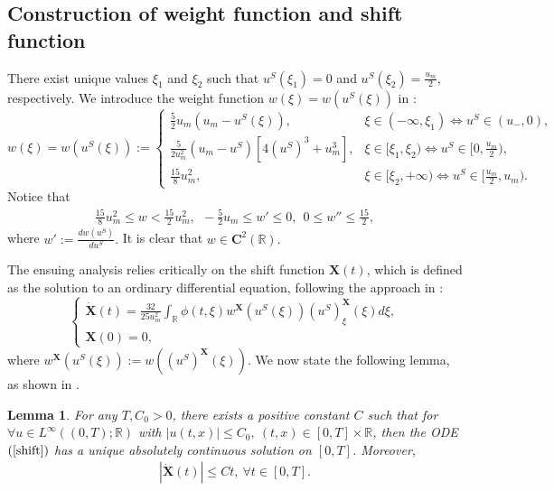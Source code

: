 \documentclass[10pt,reqno]{amsart}
\numberwithin{equation}{section}
\newtheorem{lemma}[theorem]{Lemma}
\begin{document}
	\subsection{Construction of weight function and shift function}
	There exist unique values $\xi_{1}$ and $\xi_{2}$ such that $u^S(\xi_1)=0$ and $u^S(\xi_2)= \frac{u_m}{2}$, respectively. We introduce the weight function $w(\xi)=w(u^{S}(\xi))$ in \cite{ref16}:
	\begin{equation} \label{WF}
		w(\xi)=w(u^{S}(\xi)) := \begin{cases}
			\frac{5}{2}u_{m}(u_{m} - u^{S}(\xi)), & \xi \in (-\infty, \xi_{1}) \iff u^{S} \in (u_{-}, 0), \\
			\frac{5}{2u_{m}^{2}}(u_{m} - u^{S})[4(u^{S})^{3} + u_{m}^{3}], & \xi \in [\xi_{1}, \xi_{2}) \iff u^{S} \in [0, \frac{u_{m}}{2}), \\
			\frac{15}{8}u_{m}^{2}, & \xi \in [\xi_{2}, +\infty) \iff u^{S} \in [\frac{u_{m}}{2}, u_{m}).
		\end{cases} 
	\end{equation}
	Notice that
	\begin{equation} \label{WFP}
		\begin{aligned}
			\frac{15}{8}u_m^2 \leq w < \frac{15}{2}u_m^2,\ \ 
			-\frac{5}{2}u_m \leq w' \leq 0,\ \ 
			0 \leq w'' \leq \frac{15}{2}, 
		\end{aligned}
	\end{equation}
	where $w':=\frac{dw(u^{S})}{du^S}.$ It is clear that $w\in \mathbf{C}^{2}(\mathbb{R}).$\par
	The ensuing analysis relies critically on the shift function $\mathbf{X}(t)$, which is defined as the solution to an ordinary differential equation, following the approach in \cite{ref16}:
	\begin{equation} \label{shift}
		\begin{cases}
			\dot{\mathbf{X}}(t) = \frac{32}{25u_m^2}\int_{\mathbb{R}}\phi(t, \xi)w^{\mathbf{X}}(u^S(\xi))(u^S)_{\xi}^{\mathbf{X}}(\xi)d\xi, \\
			\mathbf{X}(0) = 0,
		\end{cases} 
	\end{equation}
	where $w^{\mathbf{X}}(u^{S}(\xi)):=w\left(\left(u^{S}\right)^{\mathbf{X}}(\xi)\right).$
	We now state the following lemma, as shown in \cite{ref3,ref16}.
	\begin{lemma}\label{le0}
		For any $T,C_0>0$, there exists a positive constant $C$ such that for $\forall u\in L^{\infty}((0,T);\mathbb{R})$ with $|u(t,x)|\leq C_0,\ (t,x)\in [0,T]\times\mathbb{R}$, then the ODE $(\ref{shift})$ has a unique absolutely continuous solution on $[0,T]$. Moreover,
		\begin{align*}
			|\dot{\mathbf{X}}(t)|\leq Ct,\ \forall t\in[0,T].
		\end{align*}
	\end{lemma}
\end{document}
